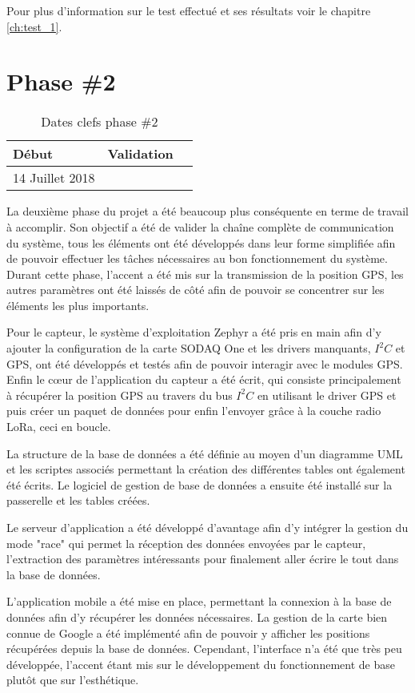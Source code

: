 Pour plus d'information sur le test effectué et ses résultats voir le chapitre \ref{ch:test_1}.

\section{Phase \#2}

\begin{table}[htb]
\caption{Dates clefs phase \#2}
\label{tab:detail_phase_2}
\centering
\begin{tabular}{ l l l }
\toprule
Début & Validation \\
\midrule
14 Juillet 2018 & \todo{}  \\
\bottomrule 
\end{tabular}
\end{table}

La deuxième phase du projet a été beaucoup plus conséquente en terme de travail à accomplir. Son objectif a été de valider la chaîne complète de communication du système, tous les éléments ont été développés dans leur forme simplifiée afin de pouvoir effectuer les tâches nécessaires au bon fonctionnement du système. Durant cette phase, l'accent a été mis sur la transmission de la position GPS, les autres paramètres ont été laissés de côté afin de pouvoir se concentrer sur les éléments les plus importants.

Pour le capteur, le système d'exploitation Zephyr a été pris en main afin d'y ajouter la configuration de la carte SODAQ One et les drivers manquants, $I^{2}C$ et GPS, ont été développés et testés afin de pouvoir interagir avec le modules GPS. Enfin le cœur de l'application du capteur a été écrit, qui consiste principalement à récupérer la position GPS au travers du bus $I^{2}C$ en utilisant le driver GPS et puis créer un paquet de données pour enfin l'envoyer grâce à la couche radio LoRa, ceci en boucle.

La structure de la base de données a été définie au moyen d'un diagramme UML et les scriptes associés permettant la création des différentes tables ont également été écrits. Le logiciel de gestion de base de données a ensuite été installé sur la passerelle et les tables créées.

Le serveur d'application a été développé d'avantage afin d'y intégrer la gestion du mode "race" qui permet la réception des données envoyées par le capteur, l'extraction des paramètres intéressants pour finalement aller écrire le tout dans la base de données.

L'application mobile a été mise en place, permettant la connexion à la base de données afin d'y récupérer les données nécessaires. La gestion de la carte bien connue de Google a été implémenté afin de pouvoir y afficher les positions récupérées depuis la base de données. Cependant, l'interface n'a été que très peu développée, l'accent étant mis sur le développement du fonctionnement de base plutôt que sur l'esthétique.

